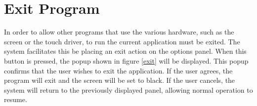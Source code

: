 \section{Exit Program}

In order to allow other programs that use the various hardware, such as the screen or the touch driver, to run the current application must be exited. The system facilitates this be placing an exit action on the options panel. When this button is pressed, the popup shown in figure \ref{exit} will be displayed. This popup confirms that the user wishes to exit the application. If the user agrees, the program will exit and the screen will be set to black. If the user cancels, the system will return to the previously displayed panel, allowing normal operation to resume.

